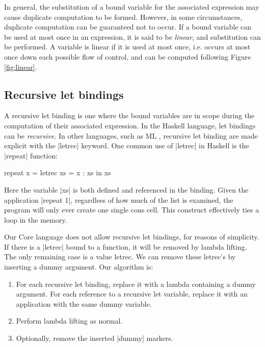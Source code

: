 In general, the substitution of a bound variable for the associated expression may cause duplicate computation to be formed. However, in some circumstances, duplicate computation can be guaranteed not to occur. If a bound variable can be used at most once in an expression, it is said to be \textit{linear}, and substitution can be performed. A variable is linear if it is used at most once, i.e. occurs at most once down each possible flow of control, and can be computed following Figure \ref{fig:linear}.

\subsection{Recursive let bindings}

A recursive let binding is one where the bound variables are in scope during the computation of their associated expression. In the Haskell language, let bindings can be \textit{recursive}. In other languages, such as ML \cite{ml}, recursive let binding are made explicit with the |letrec| keyword. One common use of |letrec| in Haskell is the |repeat| function:

\begin{example}
\begin{code}
repeat x =  letrec xs = x : xs
            in xs
\end{code}

Here the variable |xs| is both defined and referenced in the binding. Given the application |repeat 1|, regardless of how much of the list is examined, the program will only ever create one single cons cell. This construct effectively ties a loop in the memory.
\end{example}

Our Core language does not allow recursive let bindings, for reasons of simplicity. If there is a |letrec| bound to a function, it will be removed by lambda lifting. The only remaining case is a value letrec. We can remove these letrec's by inserting a dummy argument. Our algorithm is:

\begin{enumerate}
\item For each recursive let binding, replace it with a lambda containing a dummy argument. For each reference to a recursive let variable, replace it with an application with the same dummy variable.
\item Perform lambda lifting as normal.
\item Optionally, remove the inserted |dummy| markers.
\end{enumerate}

